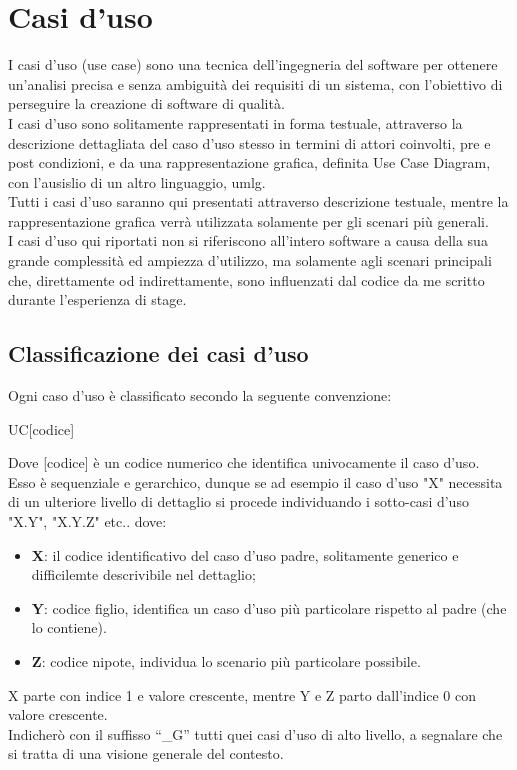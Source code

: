 \section{Casi d'uso}
I casi d'uso (use case) sono una tecnica dell'ingegneria del software per ottenere un'analisi precisa e senza ambiguità dei requisiti di un sistema, con l'obiettivo di perseguire la creazione di software di qualità.\\
I casi d'uso sono solitamente rappresentati in forma testuale, attraverso la descrizione dettagliata del caso d'uso stesso in termini di attori coinvolti, pre e post condizioni, e da una rappresentazione grafica, definita Use Case Diagram, con l'ausislio di un altro linguaggio, \gls{umlg}.\\
Tutti i casi d'uso saranno qui presentati attraverso descrizione testuale, mentre la rappresentazione grafica verrà utilizzata solamente per gli scenari più generali.\\
I casi d'uso qui riportati non si riferiscono all'intero software a causa della sua grande complessità ed ampiezza d'utilizzo, ma solamente agli scenari principali che, direttamente od indirettamente, sono influenzati dal codice da me scritto durante l'esperienza di stage.\\
\subsection{Classificazione dei casi d'uso}
Ogni caso d’uso è classificato secondo la seguente convenzione:
\begin{center}
	UC[codice]
\end{center}
Dove [codice] è un codice numerico che identifica univocamente il caso d’uso.\\
Esso è sequenziale e gerarchico, dunque se ad esempio il caso d’uso "X" necessita di un ulteriore livello di dettaglio si procede individuando i sotto-casi d’uso "X.Y", "X.Y.Z" etc.. dove:\\
\begin{itemize}
	\item \textbf{X}: il codice identificativo del caso d'uso padre, solitamente generico e difficilemte descrivibile nel dettaglio; 
	\item \textbf{Y}: codice figlio, identifica un caso d'uso più particolare rispetto al padre (che lo contiene).
	\item \textbf{Z}: codice nipote, individua lo scenario più particolare possibile.
	
\end{itemize}
X parte con indice 1 e valore crescente, mentre Y e Z parto dall'indice 0 con valore crescente.\\
Indicherò con il suffisso “\_G” tutti quei casi d’uso di alto livello, a segnalare che si tratta di una visione generale del contesto.
